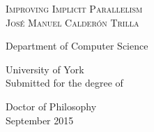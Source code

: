 \begin{titlepage}
\begin{center}

\textsc{\LARGE Improving Implicit Parallelism}\\[1.5cm]

\textsc{\large Jos\'{e} Manuel Calder\'{o}n Trilla}\\[1,5cm]

\vfill

Department of Computer Science\par
University of York \\[1,3cm]


Submitted for the degree of\par
Doctor of Philosophy \\[1,3cm]

September 2015


\end{center}
\end{titlepage}
